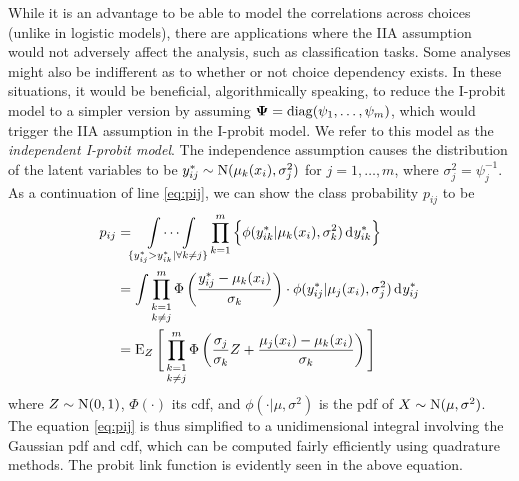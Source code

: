 While it is an advantage to be able to model the correlations across choices (unlike in logistic models), there are applications where the IIA assumption would not adversely affect the analysis, such as classification tasks.
Some analyses might also be indifferent as to whether or not choice dependency exists.
In these situations, it would be beneficial, algorithmically speaking, to reduce the I-probit model to a simpler version by assuming ${\bm\Psi} = \operatorname{diag}(\psi_1,\dots,\psi_m)$, which would trigger the IIA assumption in the I-probit model.
We refer to this model as the \emph{independent I-probit model}.
The independence assumption causes the distribution of the latent variables to be $y_{ij}^* \sim \operatorname{N}(\mu_k(x_i), \sigma_j^2)$ for $j=1,\dots,m$, where $\sigma_j^2 = \psi_j^{-1}$.
As a continuation of line \cref{eq:pij}, we can show the class probability $p_{ij}$ to be
\begin{align}
  p_{ij} 
  &= \idotsint\displaylimits_{\{y_{ij}^* > y_{ik}^* | \forall k \neq j\}} 
  \prod_{k=1}^m \Big\{ \phi(y_{ik}^*|\mu_k(x_i), \sigma_k^2) \operatorname{d}\hspace{0.5pt}\! y_{ik}^* \Big\} \nonumber \\
  &= \int \mathop{\prod_{k=1}^m}_{k\neq j} 
  \Phi \left( \frac{y_{ij}^* - \mu_k(x_i)}{\sigma_k} \right) \cdot
   \phi(y_{ij}^*|\mu_j(x_i), \sigma_j^2)  \operatorname{d}\hspace{0.5pt}\! y_{ij}^* \nonumber \\
  &= \operatorname{E}_Z \Bigg[ \mathop{\prod_{k=1}^m}_{k\neq j} 
  \Phi \left(\frac{\sigma_j}{\sigma_k} Z + \frac{\mu_j(x_i) - \mu_k(x_i)}{\sigma_k} \right) \Bigg] \label{eq:pij2}
\end{align}
where $Z\sim\operatorname{N}(0,1)$, $\Phi(\cdot)$ its cdf, and $\phi(\cdot|\mu,\sigma^2)$ is the pdf of $X\sim\operatorname{N}(\mu,\sigma^2)$.
The equation \cref{eq:pij} is thus simplified to a unidimensional integral involving the Gaussian pdf and cdf, which can be computed fairly efficiently using quadrature methods.
The probit link function is evidently seen in the above equation.
